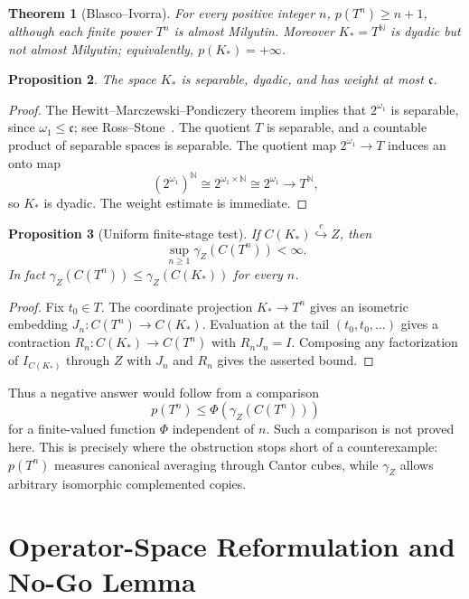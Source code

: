 \documentclass[11pt]{article}
\newtheorem{theorem}{Theorem}[section]
\newtheorem{proposition}[theorem]{Proposition}
\theoremstyle{definition}
\theoremstyle{remark}
\newcommand{\C}{C}
\newcommand{\cc}{\mathfrak c}
\newcommand{\Id}{I}
\newcommand{\hookc}{\stackrel{c}{\hookrightarrow}}
\begin{document}
\begin{theorem}[Blasco--Ivorra]\label{thm:BI}
For every positive integer \(n\), \(p(T^n)\geq n+1\), although each finite
power \(T^n\) is almost Milyutin.  Moreover \(K_*=T^{\mathbb N}\) is dyadic
but not almost Milyutin; equivalently, \(p(K_*)=+\infty\).
\end{theorem}

\begin{proposition}\label{prop:Kstar}
The space \(K_*\) is separable, dyadic, and has weight at most \(\cc\).
\end{proposition}

\begin{proof}
The Hewitt--Marczewski--Pondiczery theorem implies that \(2^{\omega_1}\) is
separable, since \(\omega_1\leq\cc\); see Ross--Stone~\cite{RossStone}.
The quotient \(T\) is separable, and a countable product of separable spaces
is separable.  The quotient map \(2^{\omega_1}\to T\) induces an onto map
\[
(2^{\omega_1})^{\mathbb N}\cong2^{\omega_1\times\mathbb N}\cong2^{\omega_1}
\longrightarrow T^{\mathbb N},
\]
so \(K_*\) is dyadic.  The weight estimate is immediate.
\end{proof}

\begin{proposition}[Uniform finite-stage test]\label{prop:finite-stage}
If \(\C(K_*)\hookc Z\), then
\[
       \sup_{n\geq1}\gamma_Z(\C(T^n))<\infty.
\]
In fact \(\gamma_Z(\C(T^n))\leq\gamma_Z(\C(K_*))\) for every \(n\).
\end{proposition}

\begin{proof}
Fix \(t_0\in T\).  The coordinate projection \(K_*\to T^n\) gives an
isometric embedding \(J_n:\C(T^n)\to\C(K_*)\).  Evaluation at the tail
\((t_0,t_0,\ldots)\) gives a contraction \(R_n:\C(K_*)\to\C(T^n)\) with
\(R_nJ_n=\Id\).  Composing any factorization of \(\Id_{\C(K_*)}\) through
\(Z\) with \(J_n\) and \(R_n\) gives the asserted bound.
\end{proof}

Thus a negative answer would follow from a comparison
\[
       p(T^n)\leq \Phi(\gamma_Z(\C(T^n)))
\]
for a finite-valued function \(\Phi\) independent of \(n\).  Such a
comparison is not proved here.  This is precisely where the obstruction
stops short of a counterexample: \(p(T^n)\) measures canonical averaging
through Cantor cubes, while \(\gamma_Z\) allows arbitrary isomorphic
complemented copies.

\section{Operator-Space Reformulation and No-Go Lemma}
\end{document}

